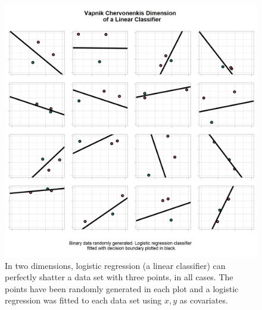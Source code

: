 \begin{figure}[H]
    \centering
    \includegraphics[width=120mm]{figs/vc_3.png}
    \caption[\Gls{vc} dimension of a linear classifier - the data is shattered.]{In two dimensions, logistic regression (a linear classifier) can perfectly shatter a data set with three points, in all cases. The points have been randomly generated in each plot and a logistic regression was fitted to each data set using $x, y$ as covariates.}
    \label{fig:vc_3}
\end{figure}

